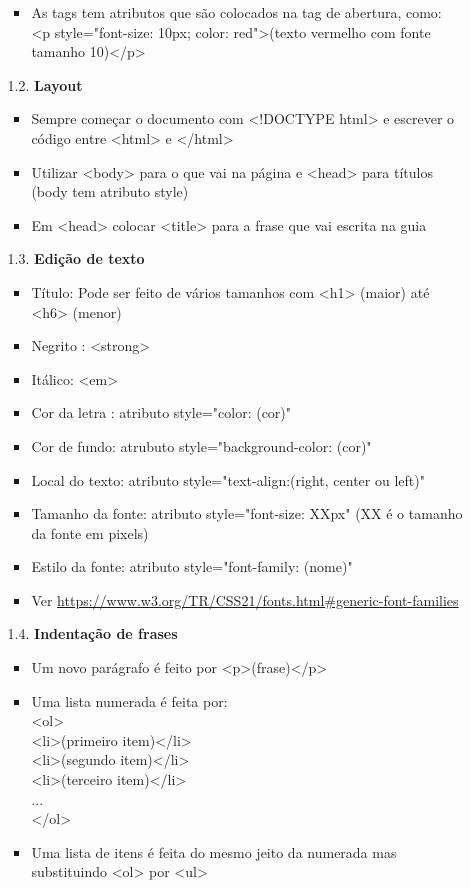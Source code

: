 \documentclass[12pt, a4paper]{article} %
\begin{document}
\begin{enumerate}
\begin{enumerate}
\begin{itemize}
\item As tags tem atributos que são colocados na tag de abertura, como: <p style="font-size: 10px; color: red">(texto vermelho com fonte tamanho 10)</p>
\end{itemize}
\item[1.2.] \textbf{Layout}
\begin{itemize}
\item Sempre começar o documento com <!DOCTYPE html> e escrever o código entre <html> e </html>
\item Utilizar <body> para o que vai na página e <head> para títulos (body tem atributo style)
\item Em <head> colocar <title> para a frase que vai escrita na guia
\end{itemize}
\item[1.3.] \textbf{Edição de texto}
\begin{itemize}
\item Título: Pode ser feito de vários tamanhos com <h1> (maior) até <h6> (menor)
\item Negrito : <strong>
\item Itálico: <em>
\item Cor da letra : atributo style="color: (cor)"
\item Cor de fundo: atrubuto style="background-color: (cor)"
\item Local do texto: atributo style="text-align:(right, center ou left)"
\item Tamanho da fonte: atributo style="font-size: XXpx" (XX é o tamanho da fonte em pixels)
\item Estilo da fonte: atributo style="font-family: (nome)"
\item Ver \url{https://www.w3.org/TR/CSS21/fonts.html#generic-font-families}
\end{itemize}
\item[1.4.] \textbf{Indentação de frases}
\begin{itemize}
\item Um novo parágrafo é feito por <p>(frase)</p>
\item Uma lista numerada é feita por:\\
<ol>\\
<li>(primeiro item)</li>\\
<li>(segundo item)</li>\\
<li>(terceiro item)</li>\\
...\\
</ol>
\item Uma lista de itens é feita do mesmo jeito da numerada mas substituindo <ol> por <ul>

\end{itemize}
\end{enumerate}
\end{enumerate}
\end{document}

